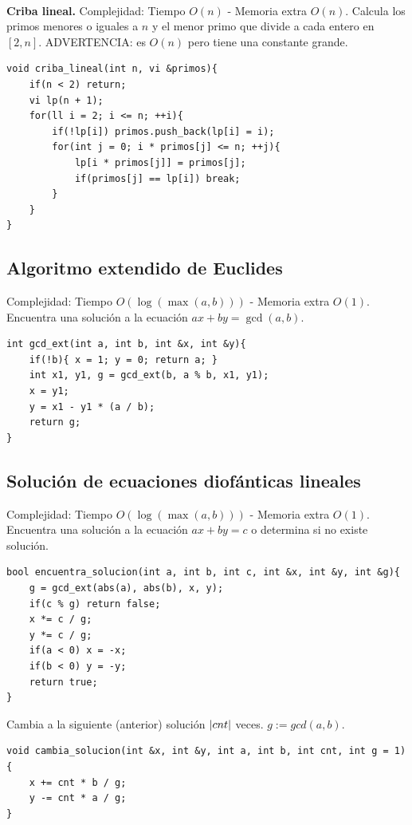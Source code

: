 \documentclass[10pt,spanish,mexico]{article}
\numberwithin{equation}{section}
\begin{document}
\begin{multicols}{2}
\vspace{-1.2\baselineskip}
\hrulefill\\
\textbf{Criba lineal.} Complejidad: Tiempo $O(n)$ - Memoria extra $O(n)$. Calcula los primos menores o iguales a $n$ y el menor primo que divide a cada entero en $[2, n]$. ADVERTENCIA: es $O(n)$ pero tiene una constante grande.
\begin{verbatim}
void criba_lineal(int n, vi &primos){
    if(n < 2) return;
    vi lp(n + 1);
    for(ll i = 2; i <= n; ++i){
        if(!lp[i]) primos.push_back(lp[i] = i);
        for(int j = 0; i * primos[j] <= n; ++j){
            lp[i * primos[j]] = primos[j];
            if(primos[j] == lp[i]) break;
        }
    }
}
\end{verbatim}

\vspace{-1.2\baselineskip}
\hrulefill
\subsection{Algoritmo extendido de Euclides}
Complejidad: Tiempo $O(\log (\max(a, b)))$ - Memoria extra $O(1)$. Encuentra una solución a la ecuación $ax + by = \gcd(a, b)$.
\begin{verbatim}
int gcd_ext(int a, int b, int &x, int &y){
    if(!b){ x = 1; y = 0; return a; }
    int x1, y1, g = gcd_ext(b, a % b, x1, y1);
    x = y1;
    y = x1 - y1 * (a / b);
    return g;
}
\end{verbatim}

\vspace{-1.2\baselineskip}
\hrulefill
\subsection{Solución de ecuaciones diofánticas lineales}
Complejidad: Tiempo $O(\log (\max(a, b)))$ - Memoria extra $O(1)$. Encuentra una solución a la ecuación $ax + by = c$ o determina si no existe solución.
\begin{verbatim}
bool encuentra_solucion(int a, int b, int c, int &x, int &y, int &g){
    g = gcd_ext(abs(a), abs(b), x, y);
    if(c % g) return false;
    x *= c / g;
    y *= c / g;
    if(a < 0) x = -x;
    if(b < 0) y = -y;
    return true;
}
\end{verbatim}

Cambia a la siguiente (anterior) solución $\abs{cnt}$ veces. $g := gcd(a ,b)$.
\begin{verbatim}
void cambia_solucion(int &x, int &y, int a, int b, int cnt, int g = 1) {
    x += cnt * b / g;
    y -= cnt * a / g;
}
\end{verbatim}


\end{multicols}
\end{document}
